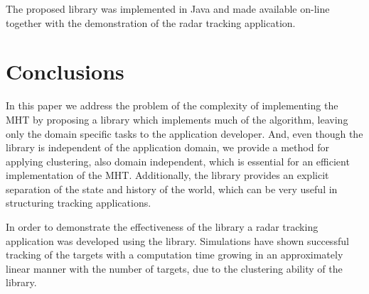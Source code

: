 The proposed library was implemented in Java and made available on-line together with the demonstration of the radar tracking application.

\section{Conclusions}
\label{sec:conclusions}

In this paper we address the problem of the complexity of implementing the MHT by proposing a library which implements much of the algorithm, leaving only the domain specific tasks to the application developer. And, even though the library is independent of the application domain, we provide a method for applying clustering, also domain independent, which is essential for an efficient implementation of the MHT. Additionally, the library provides an explicit separation of the state and history of the world, which can be very useful in structuring tracking applications.

In order to demonstrate the effectiveness of the library a radar tracking application was developed using the library. Simulations have shown successful tracking of the targets with a computation time growing in an approximately linear manner with the number of targets, due to the clustering ability of the library.

